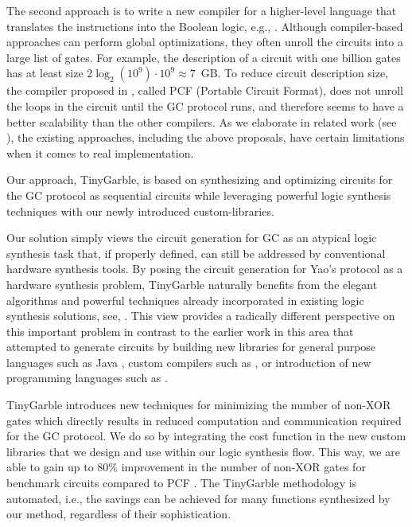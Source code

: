 The second approach is to write a new compiler for a higher-level language that translates the instructions into the Boolean logic, e.g., \cite{malkhi2004fairplay,kreuter2012billion,kreuter2013pcf,franz2014cbmc}.
Although compiler-based approaches can perform global optimizations, they often unroll the circuits into a large list of gates.
For example, the description of a circuit with one billion gates has at least size $2 \log_2 (10^9) \cdot 10^{9} \approx 7$~GB.
To reduce circuit description size, the compiler proposed in \cite{kreuter2013pcf}, called PCF (Portable Circuit Format), does not unroll the loops in the circuit until the GC protocol runs, and therefore seems to have a better scalability than the other compilers.
As we elaborate in related work (see ), the existing approaches, including the above proposals, have certain limitations when it comes to real implementation.

Our approach, TinyGarble, is based on synthesizing and optimizing circuits for the GC protocol as sequential circuits while leveraging powerful logic synthesis techniques with our newly introduced custom-libraries.

Our solution simply views the circuit generation for GC as an atypical logic synthesis task that, if properly defined, can still be addressed by conventional hardware synthesis tools.
By posing the circuit generation for Yao's protocol as a hardware synthesis problem, TinyGarble naturally benefits from the elegant algorithms and powerful techniques already incorporated in existing logic synthesis solutions, see, \cite{sentovich1992sis,micheli1994synthesis,devadas1994logic,brayton1987mis}.
This view provides a radically different perspective on this important problem in contrast to the earlier work in this area that attempted to generate circuits by building new libraries for general purpose languages such as Java \cite{huang2011faster,malka2011vmcrypt}, custom compilers such as \cite{kreuter2013pcf,franz2014cbmc}, or introduction of new programming languages such as \cite{malkhi2004fairplay,rastogi2014wysteria}.

TinyGarble introduces new techniques for minimizing the number of non-XOR gates which directly results in reduced computation and communication required for the GC protocol.
We do so by integrating the cost function in the new custom libraries that we design and use within our logic synthesis flow.
This way, we are able to gain up to $80\%$ improvement in the number of non-XOR gates for benchmark circuits compared to PCF \cite{kreuter2013pcf}.
The TinyGarble methodology is automated, i.e., the savings can be achieved for many functions synthesized by our method, regardless of their sophistication.

